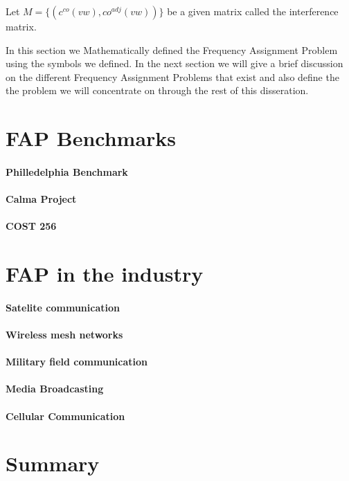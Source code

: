 Let \(M = \lbrace (c^{co} (vw),co^{adj} (vw))\rbrace\) be a given matrix called the interference matrix.

In this section we Mathematically defined the Frequency Assignment Problem using the symbols we defined. In the next section we will give a brief discussion on the different Frequency Assignment Problems that exist and also define the the problem we will concentrate on through the rest of this disseration.
\section{FAP Benchmarks}
\paragraph{Philledelphia Benchmark}
\paragraph{Calma Project}
\paragraph{COST 256}
\section{FAP in the industry}
\paragraph{Satelite communication}
\paragraph{Wireless mesh networks}
\paragraph{Military field communication}
\paragraph{Media Broadcasting}
\paragraph{Cellular Communication}
\section{Summary}
